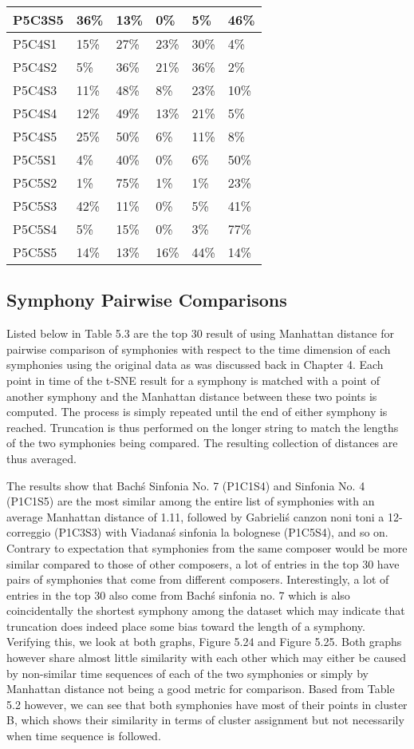 \begin{longtable}{|l|l|l|l|l|l|}
P5C3S5 & 36\% & 13\% & 0\% & 5\% & 46\% \\ \hline
P5C4S1 & 15\% & 27\% & 23\% & 30\% & 4\% \\ \hline
P5C4S2 & 5\% & 36\% & 21\% & 36\% & 2\% \\ \hline
P5C4S3 & 11\% & 48\% & 8\% & 23\% & 10\% \\ \hline
P5C4S4 & 12\% & 49\% & 13\% & 21\% & 5\% \\ \hline
P5C4S5 & 25\% & 50\% & 6\% & 11\% & 8\% \\ \hline
P5C5S1 & 4\% & 40\% & 0\% & 6\% & 50\% \\ \hline
P5C5S2 & 1\% & 75\% & 1\% & 1\% & 23\% \\ \hline
P5C5S3 & 42\% & 11\% & 0\% & 5\% & 41\% \\ \hline
P5C5S4 & 5\% & 15\% & 0\% & 3\% & 77\% \\ \hline
P5C5S5 & 14\% & 13\% & 16\% & 44\% & 14\% \\ \hline
\end{longtable}

\subsection{Symphony Pairwise Comparisons}
Listed below in Table 5.3 are the top 30 result of using Manhattan distance for pairwise comparison of symphonies with respect to the time dimension of each symphonies using the original data as was discussed back in Chapter 4. Each point in time of the t-SNE result for a symphony is matched with a point of another symphony and the Manhattan distance between these two points is computed. The process is simply repeated until the end of either symphony is reached. Truncation is thus performed on the longer string to match the lengths of the two symphonies being compared. The resulting collection of distances are thus averaged.

The results show that Bach\'s Sinfonia No. 7 (P1C1S4) and Sinfonia No. 4 (P1C1S5) are the most similar among the entire list of symphonies with an average Manhattan distance of 1.11, followed by Gabrieli\'s canzon noni toni a 12-correggio (P1C3S3) with Viadana\'s sinfonia la bolognese (P1C5S4), and so on. Contrary to expectation that symphonies from the same composer would be more similar compared to those of other composers, a lot of entries in the top 30 have pairs of symphonies that come from different composers. Interestingly, a lot of entries in the top 30 also come from Bach\'s sinfonia no. 7 which is also coincidentally the shortest symphony among the dataset which may indicate that truncation does indeed place some bias toward the length of a symphony. Verifying this, we look at both graphs, Figure 5.24 and Figure 5.25. Both graphs however share almost little similarity with each other which may either be caused by non-similar time sequences of each of the two symphonies or simply by Manhattan distance not being a good metric for comparison. Based from Table 5.2 however, we can see that both symphonies have most of their points in cluster B, which shows their similarity in terms of cluster assignment but not necessarily when time sequence is followed.

